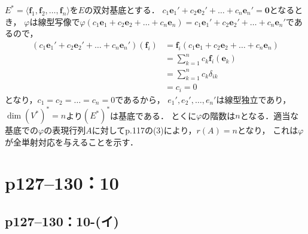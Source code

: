 \begin{tproof}
  $ E^\ast = \langle \bm{f}_1 , \bm{f}_2 , \dots , \bm{f}_n \rangle$を$E$の双対基底とする．
  $ c_1 \bm{e}_1 ' + c_2 \bm{e}_2 ' + \dots + c_n \bm{e}_n ' = \bm{0}$となるとき，
  $\varphi$は線型写像で$\varphi (c_1 \bm{e}_1 + c_2 \bm{e}_2 + \dots + c_n \bm{e}_n) = c_1 \bm{e}_1 ' + c_2 \bm{e}_2 ' + \dots + c_n \bm{e}_n '$であるので，
  \begin{align*}
    (c_1 \bm{e}_1 ' + c_2 \bm{e}_2 ' + \dots + c_n \bm{e}_n ') (\bm{f}_i) & = \bm{f}_i (c_1 \bm{e}_1 + c_2 \bm{e}_2 + \dots + c_n \bm{e}_n) \\
                                                                          & = \sum_{k=1}^{n} c_k \bm{f}_i (\bm{e}_k)                        \\
                                                                          & = \sum_{k=1}^{n} c_k \delta_{ik}                                \\
                                                                          & = c_i=0
  \end{align*}
  となり，$c_1 = c_2 = \dots = c_n = 0$であるから，
  $e_1 ' , e_2 ' , \dots , e_n '$は線型独立であり，
  $\dim (V^\ast)^\ast = n $より$(E^\ast)^\ast$は基底である．
  とくに$\varphi$の階数は$n$となる．適当な基底での$\varphi$の表現行列$A$に対してp.117の(3)により，$r(A)=n$となり，
  これは$\varphi$が全単射対応を与えることを示す．
\end{tproof}





\section*{p127--130：10}


\subsection*{p127--130：10-(イ)}

